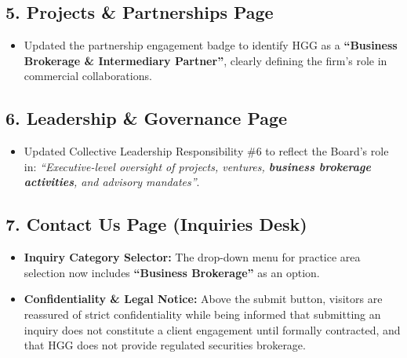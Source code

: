 \documentclass[11pt,a4paper]{article}
\begin{document}
\subsection{5. Projects \& Partnerships Page}
\begin{itemize}[leftmargin=*]
    \item Updated the partnership engagement badge to identify HGG as a \textbf{``Business Brokerage \& Intermediary Partner''}, clearly defining the firm's role in commercial collaborations.
\end{itemize}

\subsection{6. Leadership \& Governance Page}
\begin{itemize}[leftmargin=*]
    \item Updated Collective Leadership Responsibility \#6 to reflect the Board's role in: \textit{``Executive-level oversight of projects, ventures, \textbf{business brokerage activities}, and advisory mandates''}.
\end{itemize}

\subsection{7. Contact Us Page (Inquiries Desk)}
\begin{itemize}[leftmargin=*]
    \item \textbf{Inquiry Category Selector:} The drop-down menu for practice area selection now includes \textbf{``Business Brokerage''} as an option.
    \item \textbf{Confidentiality \& Legal Notice:} Above the submit button, visitors are reassured of strict confidentiality while being informed that submitting an inquiry does not constitute a client engagement until formally contracted, and that HGG does not provide regulated securities brokerage.
\end{itemize}
\end{document}
